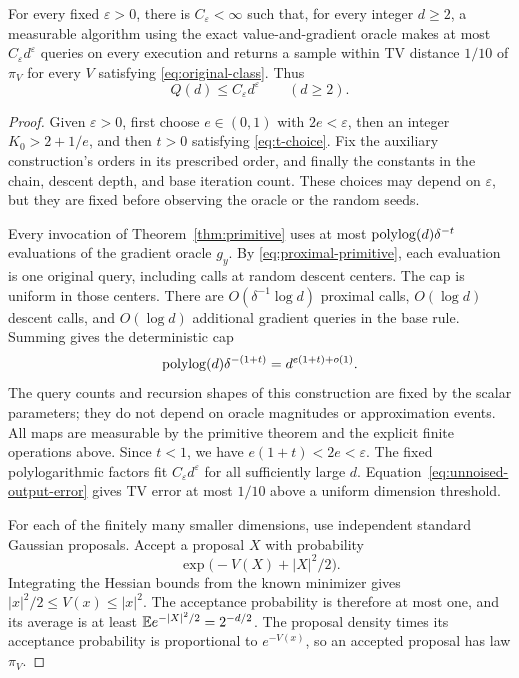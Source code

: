 \begin{theorem}\label{thm:upper}
For every fixed $\varepsilon>0$, there is $C_\varepsilon<\infty$
such that, for every integer $d\ge2$, a measurable algorithm using
the exact value-and-gradient oracle makes at most
$C_\varepsilon d^\varepsilon$ queries on every execution and
returns a sample within TV distance $1/10$ of $\pi_V$ for every
$V$ satisfying \eqref{eq:original-class}. Thus
\[
                  Q(d)\le C_\varepsilon d^\varepsilon
                       \qquad(d\ge2).
\]
\end{theorem}
\begin{proof}
Given $\varepsilon>0$, first choose $e\in(0,1)$ with
$2e<\varepsilon$, then an integer $K_0>2+1/e$, and then
$t>0$ satisfying \eqref{eq:t-choice}. Fix the auxiliary construction's
orders in its prescribed order, and finally the constants in the
chain, descent depth, and base iteration count. These choices may
depend on $\varepsilon$, but they are fixed before observing the
oracle or the random seeds.

Every invocation of Theorem~\ref{thm:primitive} uses at most
$\operatorname{polylog}(d)\delta^{-t}$ evaluations of the gradient oracle $g_y$. By
\eqref{eq:proximal-primitive}, each evaluation is one original
query, including calls at random descent centers. The cap is uniform
in those centers. There are $O(\delta^{-1}\log d)$ proximal calls,
$O(\log d)$ descent calls, and $O(\log d)$ additional gradient
queries in the base rule. Summing gives the deterministic cap
\begin{equation}\label{eq:upper-query-count}
 \operatorname{polylog}(d)\delta^{-(1+t)}=d^{e(1+t)+o(1)}.
\end{equation}
The query counts and recursion shapes of this construction are
fixed by the scalar parameters; they do not depend on oracle
magnitudes or approximation events. All maps are measurable by
the primitive theorem and the explicit finite operations above.
Since $t<1$, we have $e(1+t)<2e<\varepsilon$.
The fixed polylogarithmic factors fit $C_\varepsilon d^\varepsilon$
for all sufficiently large $d$. Equation~\eqref{eq:unnoised-output-error}
gives TV error at most $1/10$ above a uniform dimension threshold.

For each of the finitely many smaller dimensions, use independent
standard Gaussian proposals. Accept a proposal $X$ with probability
\[
                    \exp\bigl(-V(X)+|X|^2/2\bigr).
\]
Integrating the Hessian bounds from the known minimizer gives
$|x|^2/2\le V(x)\le|x|^2$. The acceptance probability is therefore
at most one, and its average is at least
$\mathbb E e^{-|X|^2/2}=2^{-d/2}$. The proposal density times its
acceptance probability is proportional to $e^{-V(x)}$, so an
accepted proposal has law $\pi_V$.


\end{proof}
